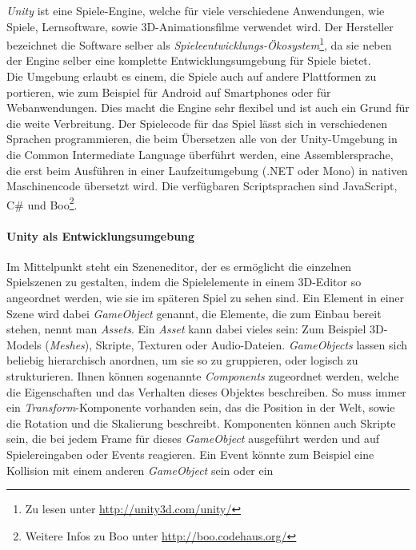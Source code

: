 \textit{Unity} ist eine Spiele-Engine, welche für viele verschiedene Anwendungen, wie Spiele, Lernsoftware, sowie 3D-Animationsfilme verwendet wird. Der Hersteller bezeichnet die Software selber als \textit{Spieleentwicklungs-Ökosystem}\footnote{Zu lesen unter \url{http://unity3d.com/unity/}}, da sie neben der Engine selber eine komplette Entwicklungsumgebung für Spiele bietet.\\
Die Umgebung erlaubt es einem, die Spiele auch auf andere Plattformen zu portieren, wie zum Beispiel für Android auf Smartphones oder für Webanwendungen. Dies macht die Engine sehr flexibel und ist auch ein Grund für die weite Verbreitung. Der Spielecode für das Spiel lässt sich in verschiedenen Sprachen programmieren, die beim Übersetzen alle von der Unity-Umgebung in die Common Intermediate Language überführt werden, eine Assemblersprache, die erst beim Ausführen in einer Laufzeitumgebung (.NET oder Mono) in nativen Maschinencode übersetzt wird. Die verfügbaren Scriptsprachen sind JavaScript, C\# und Boo\footnote{Weitere Infos zu Boo unter \url{http://boo.codehaus.org/}}.


\paragraph{Unity als Entwicklungsumgebung} Im Mittelpunkt steht ein Szeneneditor, der es ermöglicht die einzelnen Spielszenen zu gestalten, indem die Spielelemente in einem 3D-Editor so angeordnet werden, wie sie im späteren Spiel zu sehen sind. 
Ein Element in einer Szene wird dabei \textit{GameObject} genannt, die Elemente, die zum Einbau bereit stehen, nennt man \textit{Assets}. Ein \textit{Asset} kann dabei vieles sein: Zum Beispiel 3D-Models (\textit{Meshes}), Skripte, Texturen oder Audio-Dateien. \textit{GameObjects} lassen sich beliebig hierarchisch anordnen, um sie so zu gruppieren, oder logisch zu strukturieren. Ihnen können sogenannte \textit{Components} zugeordnet werden, welche die Eigenschaften und das Verhalten dieses Objektes beschreiben. So muss immer ein \textit{Transform}-Komponente vorhanden sein, das die Position in der Welt, sowie die Rotation und die Skalierung beschreibt. Komponenten können auch Skripte sein, die bei jedem Frame für dieses \textit{GameObject} ausgeführt werden und auf Spielereingaben oder Events reagieren. Ein Event könnte zum Beispiel eine Kollision mit einem anderen \textit{GameObject} sein oder ein

